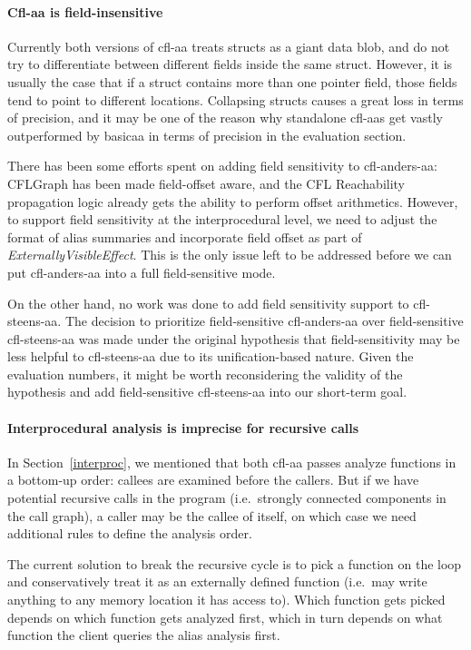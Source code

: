 \documentclass[10pt]{article}
\begin{document}
\paragraph{Cfl-aa is field-insensitive}

Currently both versions of cfl-aa treats structs as a giant data blob, and do
not try to differentiate between different fields inside the same struct.
However, it is usually the case that if a struct contains more than one pointer
field, those fields tend to point to different locations. Collapsing structs
causes a great loss in terms of precision, and it may be one of the reason
why standalone cfl-aas get vastly outperformed by basicaa in terms of precision in the
evaluation section.

There has been some efforts spent on adding field sensitivity to cfl-anders-aa:
CFLGraph has been made field-offset aware, and the CFL Reachability propagation
logic already gets the ability to perform offset arithmetics. However, to
support field sensitivity at the interprocedural level, we need to adjust the
format of alias summaries and incorporate field offset as part of
\emph{ExternallyVisibleEffect}. This is the only issue left to be addressed
before we can put cfl-anders-aa into a full field-sensitive mode. 

On the other hand, no work was done to add field sensitivity support to
cfl-steens-aa. The decision to prioritize field-sensitive cfl-anders-aa over
field-sensitive cfl-steens-aa was made under the original hypothesis that
field-sensitivity may be less helpful to cfl-steens-aa due to its
unification-based nature. Given the evaluation numbers, it might be worth
reconsidering the validity of the hypothesis and add field-sensitive
cfl-steens-aa into our short-term goal.

\paragraph{Interprocedural analysis is imprecise for recursive calls}

In Section~\ref{interproc}, we mentioned that both cfl-aa passes analyze
functions in a bottom-up order: callees are examined before the callers. But if
we have potential recursive calls in the program (i.e.\ strongly connected
components in the call graph), a caller may be the callee of itself, on which
case we need additional rules to define the analysis order.

The current solution to break the recursive cycle is to pick a function on the
loop and conservatively treat it as an externally defined function (i.e.\ may write anything to
any memory location it has access to). Which function gets picked depends on which function
gets analyzed first, which in turn depends on what function the client queries
the alias analysis first.
\end{document}

